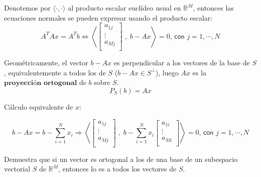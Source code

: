 Denotemos por $\langle \cdot , \cdot \rangle$ al producto escalar euclídeo usual en $\mathbb{R}^M$, entonces las ecuaciones normales se pueden expresar usando el producto escalar:
\[ A^TAx = A^Tb \Leftrightarrow \left\langle \begin{bmatrix}
a_{1j} \\
\vdots \\
a_{Mj} \\
\end{bmatrix}
\; , \;
b-Ax
\right\rangle = 0 \textsf{, con } j=1,\cdots,N \]

Geométricamente, el vector $b-Ax$ es perpendicular a los vectores de la base de $S$, equivalentemente a todos los de $S$ ($b-Ax \in S^{\bot}$), luego $Ax$ es la $\textbf{proyección ortogonal}$ de $b$ sobre $S$.
\[ P_S(b) = Ax \]

Cálculo equivalente de $x$:

\[ b-Ax = b - \sum_{i=1}^N x_i 
\Rightarrow 
\left\langle \begin{bmatrix}
a_{1j} \\
\vdots \\
a_{Mj} \\
\end{bmatrix}
\; , \;
b-\sum_{i=1}^N x_i \begin{bmatrix}
a_{1i} \\
\vdots \\
a_{Mi} \\
\end{bmatrix}
\right\rangle = 0 \textsf{, con } j=1,\cdots,N \]

\begin{ejer}
Demuestra que si un vector es ortogonal a los de una base de un subespacio vectorial $S$ de $\mathbb{R}^M$, entonces lo es a todos los vectores de $S$.
\end{ejer}

